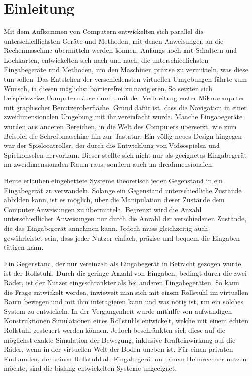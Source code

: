 \chapter{Einleitung}
Mit dem Aufkommen von Computern entwickelten sich parallel die unterschiedlichsten Geräte und Methoden, mit denen Anweisungen an die Rechenmaschine übermitteln werden können.
Anfangs noch mit Schaltern und Lochkarten, entwickelten sich nach und nach, die unterschiedlichsten Eingabegeräte und Methoden, um den Maschinen präzise zu vermitteln, was diese tun sollen.
Das Entstehen der verschiedensten virtuellen Umgebungen führte zum Wunsch, in diesen möglichst barrierefrei zu navigieren.
So setzten sich beispielsweise Computermäuse durch, mit der Verbreitung erster Mikrocomputer mit graphischer Benutzeroberfläche.
Grund dafür ist, dass die Navigation in einer zweidimensionalen Umgebung mit ihr vereinfacht wurde.
Manche Eingabegeräte wurden aus anderen Bereichen, in die Welt des Computers übersetzt, wie zum Beispiel die Schreibmaschine hin zur Tastatur.
Ein völlig neues Design hingegen war der Spielcontroller, der durch die Entwicklung von Videospielen und Spielkonsolen hervorkam.
Dieser stellte sich nicht nur als geeignetes Eingabegerät im zweidimensionalen Raum raus, sondern auch im dreidimensionalen.

Heute erlauben eingebettete Systeme theoretisch jeden Gegenstand in ein Eingabegerät zu verwandeln.
Solange ein Gegenstand unterschiedliche Zustände abbilden kann, ist es möglich, über die Manipulation dieser Zustände dem Computer Anweisungen zu übermitteln.
Begrenzt wird die Anzahl unterschiedlicher Anweisungen nur durch die Anzahl der verschiedenen Zustände, die das Eingabegerät annehmen kann.
Jedoch muss gleichzeitig auch gewährleistet sein, dass jeder Nutzer einfach, präzise und bequem die Eingaben tätigen kann.

Ein Gegenstand, der nur vereinzelt als Eingabegerät in Betracht gezogen wurde, ist der Rollstuhl.
Durch die geringe Anzahl von Eingaben, bedingt durch die zwei Räder, ist der Nutzer eingeschränkter als bei anderen Eingabegeräten.
So kann die Frage entwickelt werden, inwieweit man sich mit einem Rollstuhl im virtuellen Raum bewegen und mit ihm interagieren kann und was nötig ist, um ein solches System zu entwickeln.
In der Vergangenheit wurde mithilfe von aufwändigen Konstruktionen Simulationen eines Rollstuhls entwickelt, welche mit einem echten Rollstuhl gesteuert werden können.
Jedoch beschränkten sich diese auf die möglichst exakte Simulation der Bewegung, inklusive Krafteinwirkung auf die Räder, wenn in der virtuellen Welt der Boden uneben ist.
Für einen privaten Endkunden, der seinen Rollstuhl als Eingabegerät an seinem Heimrechner nutzen möchte, sind die bislang entwickelten Systeme ungeeignet.

